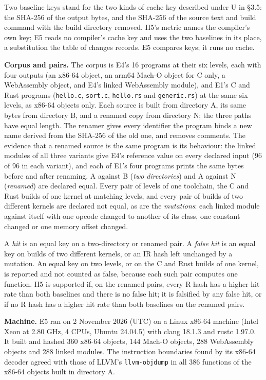 \documentclass[10pt,letterpaper]{article}
\begin{document}
Two baseline keys stand for the two kinds of cache key described under U
in §3.5: the SHA-256 of the output bytes, and the SHA-256 of the source
text and build command with the build directory removed. H5's metric
names the compiler's own key; E5 reads no compiler's cache key and uses
the two baselines in its place, a substitution the table of changes
records. E5 compares keys; it runs no cache.

\textbf{Corpus and pairs.} The corpus is E4's 16 programs at their six
levels, each with four outputs (an x86-64 object, an arm64 Mach-O object
for C only, a WebAssembly object, and E4's linked WebAssembly module),
and E1's C and Rust programs (\texttt{hello.c}, \texttt{sort.c},
\texttt{hello.rs} and \texttt{generic.\allowbreak{}rs}) at the same six levels, as
x86-64 objects only. Each source is built from directory A, its same
bytes from directory B, and a renamed copy from directory N; the three
paths have equal length. The renamer gives every identifier the program
binds a new name derived from the SHA-256 of the old one, and removes
comments. The evidence that a renamed source is the same program is its
behaviour: the linked modules of all three variants give E4's reference
value on every declared input (96 of 96 in each variant), and each of
E1's four programs prints the same bytes before and after renaming. A
against B (\emph{two directories}) and A against N (\emph{renamed}) are
declared equal. Every pair of levels of one toolchain, the C and Rust
builds of one kernel at matching levels, and every pair of builds of two
different kernels are declared not equal, as are the \emph{mutations}:
each linked module against itself with one opcode changed to another of
its class, one constant changed or one memory offset changed.

A \emph{hit} is an equal key on a two-directory or renamed pair. A
\emph{false hit} is an equal key on builds of two different kernels, or
an IR hash left unchanged by a mutation. An equal key on two levels, or
on the C and Rust builds of one kernel, is reported and not counted as
false, because each such pair computes one function. H5 is supported if,
on the renamed pairs, every R hash has a higher hit rate than both
baselines and there is no false hit; it is falsified by any false hit,
or if no R hash has a higher hit rate than both baselines on the renamed
pairs.

\textbf{Machine.} E5 ran on 2 November 2026 (UTC) on a Linux x86-64
machine (Intel Xeon at 2.80 GHz, 4 CPUs, Ubuntu 24.04.5) with clang
18.1.3 and rustc 1.97.0. It built and hashed 360 x86-64 objects, 144
Mach-O objects, 288 WebAssembly objects and 288 linked modules. The
instruction boundaries found by its x86-64 decoder agreed with those of
LLVM's \texttt{llvm-\allowbreak{}objdump} in all 386 functions of the x86-64 objects
built in directory A.
\end{document}
